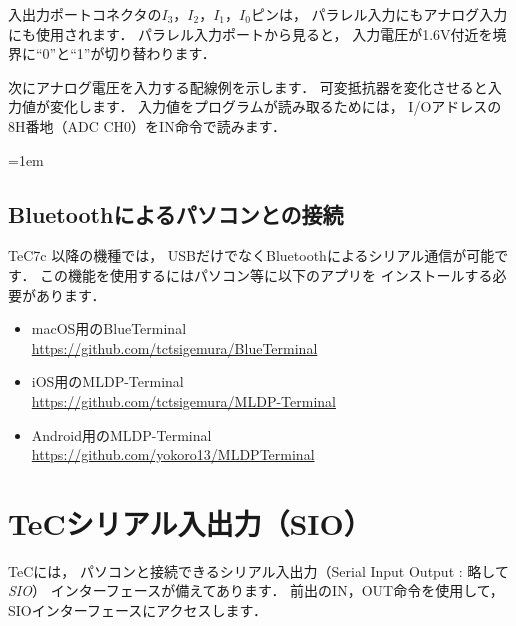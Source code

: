 入出力ポートコネクタの$I_3$，$I_2$，$I_1$，$I_0$ピンは，
パラレル入力にもアナログ入力にも使用されます．
パラレル入力ポートから見ると，
入力電圧が1.6V付近を境界に``0''と``1''が切り替わります．

次にアナログ電圧を入力する配線例を示します．
可変抵抗器を変化させると入力値が変化します．
入力値をプログラムが読み取るためには，
I/Oアドレスの8H番地（ADC CH0）をIN命令で読みます．

\begin{center}
\end{center}

\begin{framed}{\parindent=1em
  \subsection*{Bluetoothによるパソコンとの接続}
  {\small TeC7c 以降の機種では，
    USBだけでなくBluetoothによるシリアル通信が可能です．
    この機能を使用するにはパソコン等に以下のアプリを
    インストールする必要があります．

    \begin{itemize}
    \item macOS用のBlueTerminal\label{BlueTerminal} \\
      \url{https://github.com/tctsigemura/BlueTerminal}
    \item iOS用のMLDP-Terminal \\
      \url{https://github.com/tctsigemura/MLDP-Terminal}
    \item Android用のMLDP-Terminal \\
      \url{https://github.com/yokoro13/MLDPTerminal}
    \end{itemize}
  }
}\end{framed}

\newpage
\section{TeCシリアル入出力（SIO）}
\label{sio}
TeCには，
パソコンと接続できるシリアル入出力（Serial Input Output : 略して \emph{SIO}）
インターフェースが備えてあります．
前出のIN，OUT命令を使用して，
SIOインターフェースにアクセスします．

